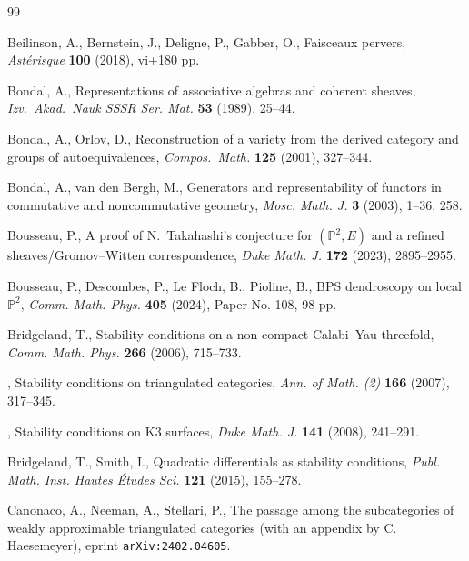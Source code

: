 \documentclass[11pt, reqno]{amsart}
\numberwithin{equation}{section}
\theoremstyle{plain}
\theoremstyle{remark}
\theoremstyle{definition}
\theoremstyle{italicsname}
\def\PP{\ensuremath{\mathbb{P}}}
\begin{document}
\begin{thebibliography}{99}

Beilinson, A., Bernstein, J., Deligne, P., Gabber, O., Faisceaux pervers, {\it Ast\'erisque} {\bf 100} (2018), vi+180 pp.


Bondal, A., Representations of associative algebras and coherent sheaves,
{\it Izv.\ Akad.\ Nauk SSSR Ser. Mat.} {\bf 53} (1989), 25--44.

Bondal, A., Orlov, D., Reconstruction of a variety from the derived category
and groups of autoequivalences, {\it Compos.\ Math.} {\bf 125} (2001), 327--344.

Bondal, A., van den Bergh, M., Generators and representability of functors in commutative and noncommutative geometry, {\it Mosc. Math. J.} {\bf 3} (2003), 1--36, 258.

Bousseau, P., A proof of N.~Takahashi's conjecture for $(\PP^2,E)$ and a refined sheaves/Gromov--Witten correspondence, {\it Duke Math. J.} {\bf 172} (2023), 2895--2955.

Bousseau, P., Descombes, P., Le Floch, B., Pioline, B., BPS dendroscopy on local $\PP^2$, {\it Comm. Math. Phys.} {\bf 405} (2024), Paper No. 108, 98 pp.

Bridgeland, T., Stability conditions on a non-compact Calabi--Yau threefold, {\it Comm. Math. Phys.} {\bf 266} (2006), 715--733.

\bysame, Stability conditions on triangulated categories, {\it Ann. of Math. (2)} {\bf 166} (2007), 317--345.

\bysame, Stability conditions on K3 surfaces, {\it Duke Math. J.} {\bf 141} (2008), 241--291.

Bridgeland, T., Smith, I., Quadratic differentials as stability conditions,
{\it Publ. Math. Inst. Hautes \'Etudes Sci.} {\bf 121} (2015), 155--278.

Canonaco, A., Neeman, A., Stellari, P., The passage among the subcategories of weakly approximable triangulated categories (with an appendix by C. Haesemeyer), eprint {\tt arXiv:2402.04605}.


\end{thebibliography}
\end{document}
